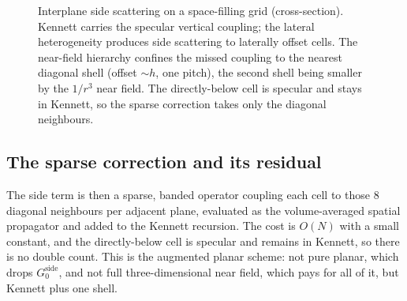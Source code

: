 \documentclass[11pt,a4paper]{article}
\begin{document}
\begin{figure}[h]
\centering
{}
\caption{Interplane side scattering on a space-filling grid (cross-section). Kennett carries
the specular vertical coupling; the lateral heterogeneity produces side scattering to laterally
offset cells. The near-field hierarchy confines the missed coupling to the nearest diagonal
shell (offset $\sim h$, one pitch), the second shell being smaller by the $1/r^{3}$ near field.
The directly-below cell is specular and stays in Kennett, so the sparse correction takes only
the diagonal neighbours.}
\end{figure}

\subsection{The sparse correction and its residual}

The side term is then a sparse, banded operator coupling each cell to those $8$ diagonal
neighbours per adjacent plane, evaluated as the volume-averaged spatial propagator and added to
the Kennett recursion. The cost is $O(N)$ with a small constant, and the directly-below cell is
specular and remains in Kennett, so there is no double count. This is the augmented planar
scheme: not pure planar, which drops $G_0^{\text{side}}$, and not full three-dimensional near
field, which pays for all of it, but Kennett plus one shell.
\end{document}
